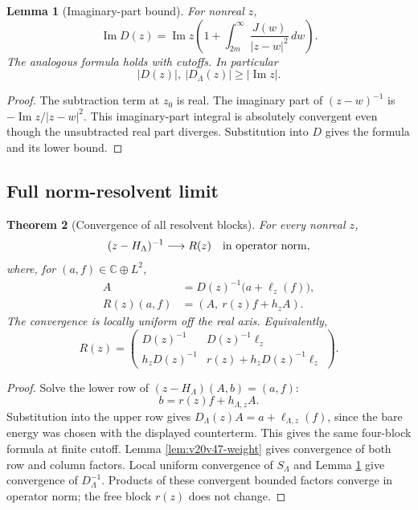 \documentclass[11pt]{article}
\newtheorem{theorem}{Theorem}[section]
\newtheorem{lemma}[theorem]{Lemma}
\theoremstyle{remark}
\begin{document}
\begin{lemma}[Imaginary-part bound]
\label{lem:v20v47-denominator}
For nonreal \(z\),
\[
 \operatorname{Im}D(z)=\operatorname{Im}z
 \left(1+\int_{2m}^{\infty}\frac{J(w)}{|z-w|^2}\,dw\right).
\]
The analogous formula holds with cutoffs.  In particular
\[
 |D(z)|,\ |D_\Lambda(z)|\geq|\operatorname{Im}z|.
\]
\end{lemma}
\begin{proof}
The subtraction term at \(z_0\) is real.  The imaginary part of
\((z-w)^{-1}\) is \(-\operatorname{Im}z/|z-w|^2\).
This imaginary-part integral is absolutely convergent even though
the unsubtracted real part diverges.  Substitution into \(D\)
gives the formula and its lower bound.
\end{proof}

\subsection{Full norm-resolvent limit}

\begin{theorem}[Convergence of all resolvent blocks]
\label{thm:v20v47-limit}
For every nonreal \(z\),
\[
 (z-H_\Lambda)^{-1}\longrightarrow R(z)
 \quad\hbox{in operator norm},
\]
where, for \((a,f)\in\mathbb C\oplus L^2\),
\[
 \begin{split}
 A&=D(z)^{-1}\bigl(a+\ell_z(f)\bigr),\\
 R(z)(a,f)&=(A,\ r(z)f+h_z A).
 \end{split}
\]
The convergence is locally uniform off the real axis.  Equivalently,
\[
 R(z)=
 \begin{pmatrix}
 D(z)^{-1}&D(z)^{-1}\ell_z\\
 h_zD(z)^{-1}&r(z)+h_zD(z)^{-1}\ell_z
 \end{pmatrix}.
\]
\end{theorem}
\begin{proof}
Solve the lower row of \((z-H_\Lambda)(A,b)=(a,f)\):
\[
 b=r(z)f+h_{\Lambda,z}A.
\]
Substitution into the upper row gives
\(D_\Lambda(z)A=a+\ell_{\Lambda,z}(f)\), since the bare energy
was chosen with the displayed counterterm.
This gives the same four-block formula at finite cutoff.
Lemma \ref{lem:v20v47-weight} gives convergence of both row and
column factors.  Local uniform convergence of \(S_\Lambda\) and
Lemma \ref{lem:v20v47-denominator} give convergence of
\(D_\Lambda^{-1}\).  Products of these convergent bounded factors
converge in operator norm; the free block \(r(z)\) does not change.
\end{proof}
\end{document}
